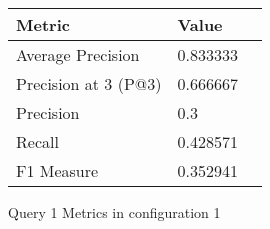 \begin{figure}[H]
\begin{center}
\begin{tabular}{lll}
\toprule
{}                      Metric &         Value \\
\midrule
     Average Precision &  0.833333 \\
  Precision at 3 (P@3) &  0.666667 \\
             Precision &       0.3 \\
                Recall &  0.428571 \\
            F1 Measure &  0.352941 \\
\bottomrule
\end{tabular}
\end{center}
\caption{Query 1 Metrics in configuration 1}
\label{fig:query_1_metrics_config_1}
\end{figure}